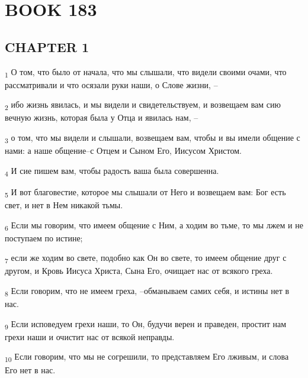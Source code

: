 \section{BOOK 183}
\subsection{CHAPTER 1}
\begin{tcolorbox}
\textsubscript{1} О том, что было от начала, что мы слышали, что видели своими очами, что рассматривали и что осязали руки наши, о Слове жизни, --
\end{tcolorbox}
\begin{tcolorbox}
\textsubscript{2} ибо жизнь явилась, и мы видели и свидетельствуем, и возвещаем вам сию вечную жизнь, которая была у Отца и явилась нам, --
\end{tcolorbox}
\begin{tcolorbox}
\textsubscript{3} о том, что мы видели и слышали, возвещаем вам, чтобы и вы имели общение с нами: а наше общение--с Отцем и Сыном Его, Иисусом Христом.
\end{tcolorbox}
\begin{tcolorbox}
\textsubscript{4} И сие пишем вам, чтобы радость ваша была совершенна.
\end{tcolorbox}
\begin{tcolorbox}
\textsubscript{5} И вот благовестие, которое мы слышали от Него и возвещаем вам: Бог есть свет, и нет в Нем никакой тьмы.
\end{tcolorbox}
\begin{tcolorbox}
\textsubscript{6} Если мы говорим, что имеем общение с Ним, а ходим во тьме, то мы лжем и не поступаем по истине;
\end{tcolorbox}
\begin{tcolorbox}
\textsubscript{7} если же ходим во свете, подобно как Он во свете, то имеем общение друг с другом, и Кровь Иисуса Христа, Сына Его, очищает нас от всякого греха.
\end{tcolorbox}
\begin{tcolorbox}
\textsubscript{8} Если говорим, что не имеем греха, --обманываем самих себя, и истины нет в нас.
\end{tcolorbox}
\begin{tcolorbox}
\textsubscript{9} Если исповедуем грехи наши, то Он, будучи верен и праведен, простит нам грехи наши и очистит нас от всякой неправды.
\end{tcolorbox}
\begin{tcolorbox}
\textsubscript{10} Если говорим, что мы не согрешили, то представляем Его лживым, и слова Его нет в нас.
\end{tcolorbox}
